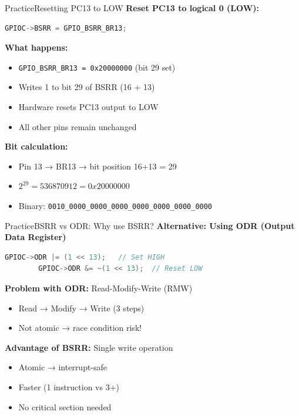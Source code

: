 \documentclass{beamer}
\begin{document}
\begin{frame}[fragile]{Practice}{Resetting PC13 to LOW}
	\textbf{Reset PC13 to logical 0 (LOW):}
	
	\begin{lstlisting}[language=C, basicstyle=\ttfamily\small]
		GPIOC->BSRR = GPIO_BSRR_BR13;
	\end{lstlisting}
	
	\medskip
	\textbf{What happens:}
	\begin{itemize}
		\item \texttt{GPIO\_BSRR\_BR13 = 0x20000000} (bit 29 set)
		\item Writes 1 to bit 29 of BSRR (16 + 13)
		\item Hardware resets PC13 output to LOW
		\item All other pins remain unchanged
	\end{itemize}
	
	\medskip
	\textbf{Bit calculation:}
	\begin{itemize}
		\item Pin 13 → BR13 → bit position 16+13 = 29
		\item $2^{29} = 536870912 = 0x20000000$
		\item Binary: \texttt{0010\_0000\_0000\_0000\_0000\_0000\_0000\_0000}
	\end{itemize}
\end{frame}
\begin{frame}[fragile]{Practice}{BSRR vs ODR: Why use BSRR?}
	\textbf{Alternative: Using ODR (Output Data Register)}
	
	\begin{lstlisting}[language=C, basicstyle=\ttfamily\small]
		GPIOC->ODR |= (1 << 13);   // Set HIGH
		GPIOC->ODR &= ~(1 << 13);  // Reset LOW
	\end{lstlisting}
	
	\textbf{Problem with ODR:} Read-Modify-Write (RMW)
	\begin{itemize}
		\item Read → Modify → Write (3 steps)
		\item Not atomic → race condition risk!
	\end{itemize}
	
	\textbf{Advantage of BSRR:} Single write operation
	\begin{itemize}
		\item Atomic → interrupt-safe
		\item Faster (1 instruction vs 3+)
		\item No critical section needed
	\end{itemize}
\end{frame}
\end{document}
